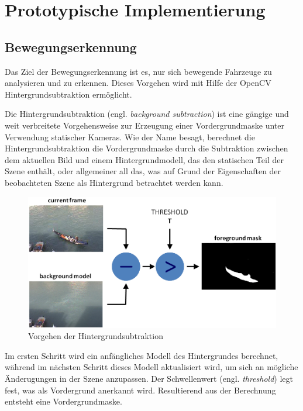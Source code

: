 
\chapter{Prototypische Implementierung}

\section{Bewegungserkennung}

Das Ziel der Bewegungserkennung ist es, nur sich bewegende Fahrzeuge zu analysieren und zu erkennen. Dieses Vorgehen wird mit Hilfe der OpenCV Hintergrundsubtraktion ermöglicht. 

Die Hintergrundsubtraktion (engl. \emph{background subtraction}) ist eine gängige und weit verbreitete Vorgehensweise zur Erzeugung einer Vordergrundmaske unter Verwendung statischer Kameras. Wie der Name besagt, berechnet die Hintergrundsubtraktion die Vordergrundmaske durch die Subtraktion zwischen dem aktuellen Bild und einem Hintergrundmodell, das den statischen Teil der Szene enthält, oder allgemeiner all das, was auf Grund der Eigenschaften der beobachteten Szene als Hintergrund betrachtet werden kann. 

\begin{figure}[htb]
	\centering
	\includegraphics[width=\textwidth]{images/background_subtraction}
	\caption[Vorgehen der Hintergrundsubtraktion]{Vorgehen der Hintergrundsubtraktion \cite{opencv_bg_subtraction}}
\end{figure}

Im ersten Schritt wird ein anfängliches Modell des Hintergrundes berechnet, während im nächsten Schritt dieses Modell aktualisiert wird, um sich an mögliche Änderugungen in der Szene anzupassen. Der Schwellenwert (engl. \emph{threshold}) legt fest, was als Vordergrund anerkannt wird. Resultierend aus der Berechnung entsteht eine Vordergrundmaske. 


